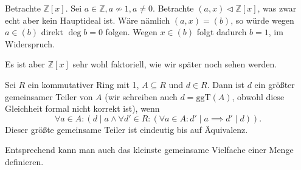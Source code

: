 \begin{example}
    Betrachte $\mathbb{Z}[x]$. Sei $a \in \mathbb{Z}, a \not\sim 1, a \neq 0$. Betrachte $({a,x}) \vartriangleleft \mathbb{Z}[x]$, was zwar echt aber kein Hauptideal ist. Wäre nämlich $({a,x}) = (b)$, so würde wegen $a \in (b)$ direkt $\deg b = 0$ folgen. Wegen $x \in (b)$ folgt dadurch $b = 1$, im Widerspruch.

    Es ist aber $\mathbb{Z}[x]$ sehr wohl faktoriell, wie wir später noch sehen werden.
\end{example}

\begin{definition}
    Sei $R$ ein kommutativer Ring mit 1, $A \subseteq R$ und $d \in R$. Dann ist $d$ ein größter gemeinsamer Teiler von $A$ (wir schreiben auch $d = \mathrm{ggT}(A)$, obwohl diese Gleichheit formal nicht korrekt ist), wenn
    $$ \forall a \in A: ( d \mid a \land \forall d' \in R : ( \forall a \in A: d' \mid a \implies d' \mid d ) ). $$
    Dieser größte gemeinsame Teiler ist eindeutig bis auf Äquivalenz.

    Entsprechend kann man auch das kleinste gemeinsame Vielfache einer Menge definieren.
\end{definition}
